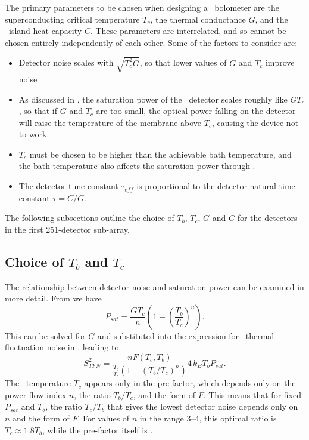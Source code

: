 The primary parameters to be chosen when designing a \TES\ bolometer are the superconducting critical temperature $T_c$, the thermal conductance $G$, and the \TES\ island heat capacity $C$.
These parameters are interrelated, and so cannot be chosen entirely independently of each other.
Some of the factors to consider are:
\begin{itemize}
  \item Detector noise scales with $\sqrt{T_c^2 G}$, so that lower values of $G$ and $T_c$ improve noise
  \item As discussed in , the saturation power of the \TES\ detector scales roughly like $G T_c$, so that if $G$ and $T_c$ are too small, the optical power falling on the detector will raise the temperature of the membrane above $T_c$, causing the device not to work.
  \item $T_c$ must be chosen to be higher than the achievable bath temperature, and the bath temperature also affects the saturation power through .
  \item The detector time constant $\tau_{eff}$ is proportional to the detector natural time constant $\tau = C / G$.
\end{itemize}


The following subsections outline the choice of $T_b$, $T_c$, $G$ and $C$ for the detectors in the first 251-detector sub-array.

\subsection{Choice of $T_b$ and $T_c$}

The relationship between detector noise and saturation power can be examined in more detail.
From  we have
\begin{equation} \label{eqn:ch5-psat}
P_{sat} = \frac{G T_c}{n}\left(1 - \left(\frac{T_b}{T_c}\right)^n\right).
\end{equation}
This can be solved for $G$ and substituted into the expression for \TES\ thermal fluctuation noise in , leading to
\begin{equation} \label{eqn:ch5-tes-noise}
S^2_{TFN} = \frac{n F(T_c, T_b) }{\frac{T_b}{T_c} \left( 1-(T_b/T_c)^n \right)} 4 \, k_B T_b P_{sat}.
\end{equation}
The \TES\ temperature $T_c$ appears only in the pre-factor, which depends only on the power-flow index $n$, the ratio $T_b/T_c$, and the form of $F$.
This means that for fixed $P_{sat}$ and $T_b$, the ratio $T_c/T_b$ that gives the lowest detector noise depends only on $n$ and the form of $F$.
For values of $n$ in the range 3--4, this optimal ratio is $T_c \approx 1.8 T_b$, while the pre-factor itself is .

